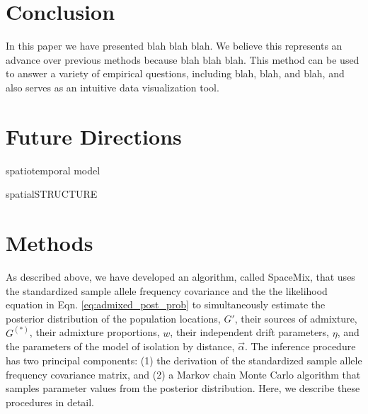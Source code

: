 \documentclass[12pt]{article}
\newcommand{\identifyadmixsource}[1]{{#1^{(*)}}}
\begin{document}
\section*{Conclusion}
In this paper we have presented blah blah blah.  We believe this represents an advance over previous methods because blah blah blah.  This method can be used to answer a variety of empirical questions, including blah, blah, and blah, and also serves as an intuitive data visualization tool.

\section*{Future Directions}

spatiotemporal model

spatialSTRUCTURE

\section*{Methods}
As described above, we have developed an algorithm, called SpaceMix, that uses the standardized sample allele frequency covariance and the the likelihood equation in Eqn. \eqref{eq:admixed_post_prob} to simultaneously estimate the posterior distribution of the population locations, $G'$, their sources of admixture, $\identifyadmixsource{G}$, their admixture proportions, $w$, their independent drift parameters, $\eta$, and the parameters of the model of isolation by distance, $\vec{\alpha}$.  The inference procedure has two principal components: (1) the derivation of the standardized sample allele frequency covariance matrix, and (2) a Markov chain Monte Carlo algorithm that samples parameter values from the posterior distribution.  Here, we describe these procedures in detail.
\end{document}
